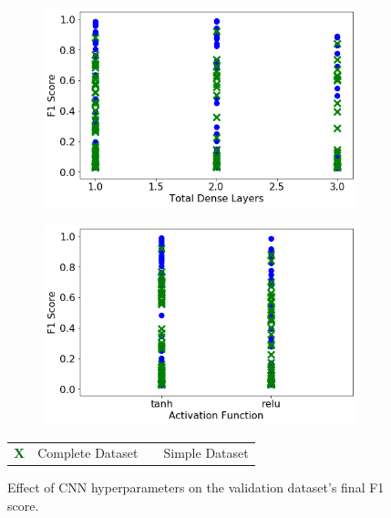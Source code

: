 \begin{figure}
    \begin{subfigure}[t]{0.49\textwidth}
        \centering
        \includegraphics[width=\textwidth]{images/cnn_dense_layers_total.png}
        \caption{}
        \label{fig:cnn_dense_layers_total}
    \end{subfigure}
	\hfill
	\begin{subfigure}[t]{0.49\textwidth}
		\centering
		\includegraphics[width=\textwidth]{images/cnn_activation_function.png}
		\caption{}
		\label{fig:cnn_activation_function}
	\end{subfigure}

		\begin{tabular}{r@{ : }l r@{ : }l}
			\textcolor{darkgreen}{\textbf{\large{X}}} & Complete Dataset & \bluecircle & Simple Dataset \\
		\end{tabular}
        \caption{Effect of CNN hyperparameters on the validation dataset's final F1 score.}
        \label{fig:cnn_hyperparameters_f1_score}
\end{figure}

